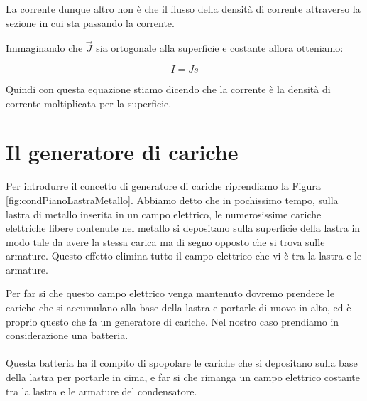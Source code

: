 La corrente dunque altro non è che il flusso della densità di corrente attraverso la sezione in cui sta passando la corrente.

Immaginando che $\Vec{J}$ sia ortogonale alla superficie e costante allora otteniamo:

\begin{equation*}
    I = Js
\end{equation*}

Quindi con questa equazione stiamo dicendo che la corrente è la densità di corrente moltiplicata per la superficie.


\section{Il generatore di cariche}

Per introdurre il concetto di generatore di cariche riprendiamo la Figura \ref{fig:condPianoLastraMetallo}. Abbiamo detto che in pochissimo tempo, sulla lastra di metallo inserita in un campo elettrico, le numerosissime cariche elettriche libere contenute nel metallo si depositano sulla superficie della lastra in modo tale da avere la stessa carica ma di segno opposto che si trova sulle armature. Questo effetto elimina tutto il campo elettrico che vi è tra la lastra e le armature.

Per far si che questo campo elettrico venga mantenuto dovremo prendere le cariche che si accumulano alla base della lastra e portarle di nuovo in alto, ed è proprio questo che fa un generatore di cariche. Nel nostro caso prendiamo in considerazione una batteria.
\paragraph{}
Questa batteria ha il compito di spopolare le cariche che si depositano sulla base della lastra per portarle in cima, e far si che rimanga un campo elettrico costante tra la lastra e le armature del condensatore.




